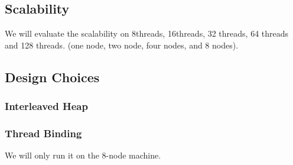 \subsection{Scalability}
\label{sec:scale}
We will evaluate the scalability on 8threads, 16threads, 32 threads, 64 threads and 128 threads. 
(one node, two node, four nodes, and 8 nodes). 

\subsection{Design Choices}
\label{sec:design}

\subsubsection{Interleaved Heap} 

\subsubsection{Thread Binding}
\label{sec: threadbinding}
We will only run it on the 8-node machine. 

